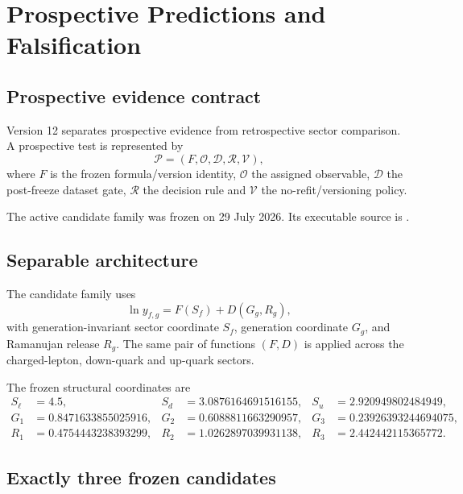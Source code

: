\chapter{Prospective Predictions and Falsification}
\label{ch:v12_predictions_falsification}

\section{Prospective evidence contract}

Version 12 separates prospective evidence from retrospective sector comparison. A prospective test is represented by
\begin{equation}
\boxed{
\mathcal P
=(F,\mathcal O,\mathcal D,\mathcal R,\mathcal V),
}
\end{equation}
where $F$ is the frozen formula/version identity, $\mathcal O$ the assigned observable, $\mathcal D$ the post-freeze dataset gate, $\mathcal R$ the decision rule and $\mathcal V$ the no-refit/versioning policy.

The active candidate family was frozen on 29 July 2026. Its executable source is
.

\section{Separable architecture}

The candidate family uses
\begin{equation}
\boxed{
\ln y_{f,g}=F(S_f)+D(G_g,R_g),
}
\label{eq:v12_prospective_separable}
\end{equation}
with generation-invariant sector coordinate $S_f$, generation coordinate $G_g$, and Ramanujan release $R_g$. The same pair of functions $(F,D)$ is applied across the charged-lepton, down-quark and up-quark sectors.

The frozen structural coordinates are
\begin{align}
S_\ell&=4.5,
&S_d&=3.0876164691516155,
&S_u&=2.920949802484949,\\
G_1&=0.8471633855025916,
&G_2&=0.6088811663290957,
&G_3&=0.23926393244694075,\\
R_1&=0.4754443238393299,
&R_2&=1.0262897039931138,
&R_3&=2.442442115365772.
\end{align}

\section{Exactly three frozen candidates}

